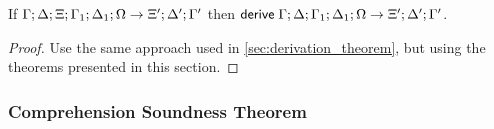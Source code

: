 \begin{theorem}
   If $\do \Gamma; \Delta; \Xi; \Gamma_1; \Delta_1; \Omega \rightarrow \Xi'; \Delta'; \Gamma'$ then $\mathsf{derive} \; \Gamma; \Delta; \Gamma_1; \Delta_1; \Omega \rightarrow \Xi'; \Delta'; \Gamma'$.
\end{theorem}

\begin{proof}
   Use the same approach used in \ref{sec:derivation_theorem}, but using the theorems presented in this section.
\end{proof}

\subsubsection{Comprehension Soundness Theorem}